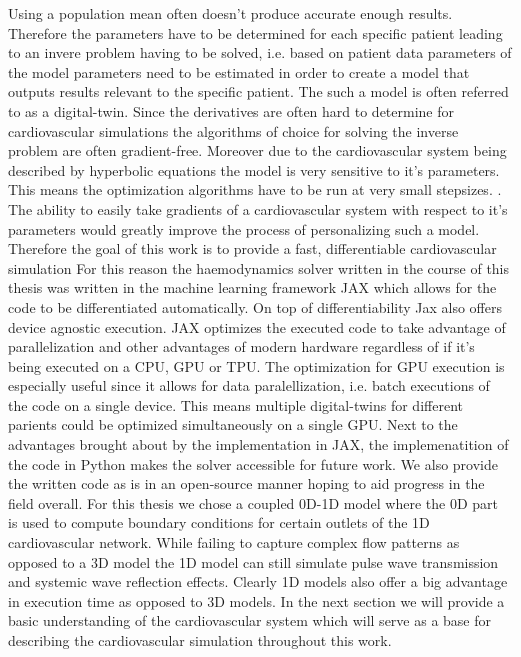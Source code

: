 \documentclass[a4paper, oneside]{discothesis}
\begin{document}
Using a population mean often doesn't produce accurate enough results.
Therefore the parameters have to be determined for each specific patient leading to an invere problem having to be solved, i.e. based on patient data parameters of the model parameters need to be estimated in order to create a model that outputs results relevant to the specific patient.
The such a model is often referred to as a digital-twin.
Since the derivatives are often hard to determine for cardiovascular simulations the algorithms of choice for solving the inverse problem are often gradient-free. 
Moreover due to the cardiovascular system being described by hyperbolic equations the model is very sensitive to it's parameters.
This means the optimization algorithms have to be run at very small stepsizes. \cite{taylor2009patient,tuccio2022parameter,marsden2014optimization,mineroff2019optimization,bozkurt2022patient}.
The ability to easily take gradients of a cardiovascular system with respect to it's parameters would greatly improve the process of personalizing such a model.
Therefore the goal of this work is to provide a fast, differentiable cardiovascular simulation
For this reason the haemodynamics solver written in the course of this thesis was written in the machine learning framework JAX which allows for the code to be differentiated automatically.
On top of differentiability Jax also offers device agnostic execution.
JAX optimizes the executed code to take advantage of parallelization and other advantages of modern hardware regardless of if it's being executed on a CPU, GPU or TPU.
The optimization for GPU execution is especially useful since it allows for data paralellization, i.e. batch executions of the code on a single device.
This means multiple digital-twins for different parients could be optimized simultaneously on a single GPU.
Next to the advantages brought about by the implementation in JAX, the implemenatition of the code in Python makes the solver accessible for future work.
We also provide the written code as is in an open-source manner hoping to aid progress in the field overall.
For this thesis we chose a coupled 0D-1D model where the 0D part is used to compute boundary conditions for certain outlets of the 1D cardiovascular network.
While failing to capture complex flow patterns as opposed to a 3D model the 1D model can still simulate pulse wave transmission and systemic wave reflection effects. \cite{shi2011review} 
Clearly 1D models also offer a big advantage in execution time as opposed to 3D models.
In the next section we will provide a basic understanding of the cardiovascular system which will serve as a base for describing the cardiovascular simulation throughout this work.
\end{document}
